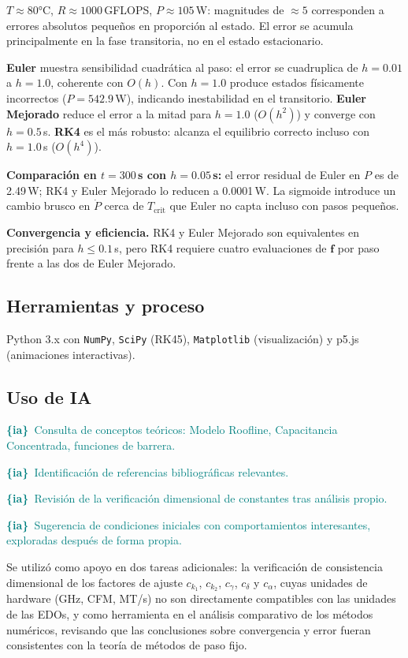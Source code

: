 \documentclass[10pt, twocolumn]{article}
\newcommand{\ia}[1]{\textcolor{teal}{\textbf{\{ia\}}~#1}}
\begin{document}
$T\approx80$°C, $R\approx1000$\,GFLOPS, $P\approx105$\,W:
magnitudes de $\approx5$ corresponden a errores absolutos pequeños en
proporción al estado. El error se acumula principalmente en la fase
transitoria, no en el estado estacionario.

\textbf{Euler} muestra sensibilidad cuadrática al paso: el error se
cuadruplica de $h=0.01$ a $h=1.0$, coherente con $O(h)$. Con $h=1.0$
produce estados físicamente incorrectos ($P=542.9$\,W), indicando
inestabilidad en el transitorio. \textbf{Euler Mejorado} reduce el error
a la mitad para $h=1.0$ ($O(h^2)$) y converge con $h=0.5$\,s.
\textbf{RK4} es el más robusto: alcanza el equilibrio correcto incluso
con $h=1.0$\,s ($O(h^4)$).

\textbf{Comparación en $t=300$\,s con $h=0.05$\,s:} el error residual de
Euler en $P$ es de 2.49\,W; RK4 y Euler Mejorado lo reducen a 0.0001\,W.
La sigmoide introduce un cambio brusco en $\dot{P}$ cerca de $T_\text{crit}$
que Euler no capta incluso con pasos pequeños.

\textbf{Convergencia y eficiencia.} RK4 y Euler Mejorado son
equivalentes en precisión para $h\leq0.1$\,s, pero RK4 requiere cuatro
evaluaciones de $\mathbf{f}$ por paso frente a las dos de Euler Mejorado.


\subsection{Herramientas y proceso}

Python 3.x con \texttt{NumPy}, \texttt{SciPy} (RK45),
\texttt{Matplotlib} (visualización) y p5.js (animaciones interactivas).


\subsection{Uso de IA}

\ia{Consulta de conceptos teóricos: Modelo Roofline, Capacitancia
Concentrada, funciones de barrera.}

\ia{Identificación de referencias bibliográficas relevantes.}

\ia{Revisión de la verificación dimensional de constantes tras análisis propio.}

\ia{Sugerencia de condiciones iniciales con comportamientos interesantes,
exploradas después de forma propia.}

Se utilizó como apoyo en dos tareas
adicionales: la verificación de consistencia dimensional de los factores
de ajuste $c_{k_1}$, $c_{k_2}$, $c_{\gamma}$, $c_{\delta}$ y $c_{\alpha}$,
cuyas unidades de hardware (GHz, CFM, MT/s) no son directamente compatibles
con las unidades de las EDOs, y como herramienta en el
análisis comparativo de los métodos numéricos, revisando que las
conclusiones sobre convergencia y error fueran consistentes con la
teoría de métodos de paso fijo.
\end{document}
